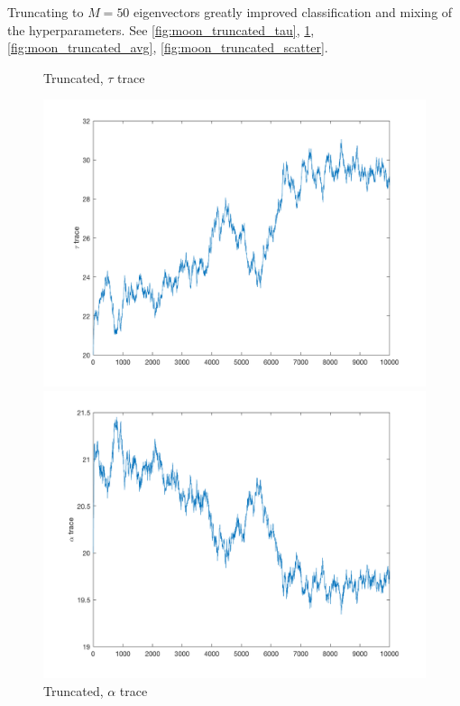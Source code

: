\documentclass{siamart1116}
\begin{document}
Truncating to $M=50$ eigenvectors greatly improved classification and mixing of the hyperparameters. See \cref{fig:moon_truncated_tau}, \cref{fig:moon_truncated_alpha}, \cref{fig:moon_truncated_avg}, \cref{fig:moon_truncated_scatter}.

\begin{figure}[!htb]
    \begin{minipage}{0.48\textwidth}
        \centering
        \caption{\label{fig:moon_truncated_tau} Truncated, $\tau$ trace}
        \includegraphics[width=\linewidth]{graphics/moons/centered_truncated/trace_tau.png}
    \end{minipage} \hfill
    \begin{minipage}{0.48\textwidth}
        \centering
        \caption{\label{fig:moon_truncated_alpha} Truncated, $\alpha$ trace}
        \includegraphics[width=\linewidth]{graphics/moons/centered_truncated/trace_alpha.png}
    \end{minipage}
\end{figure}
\end{document}
